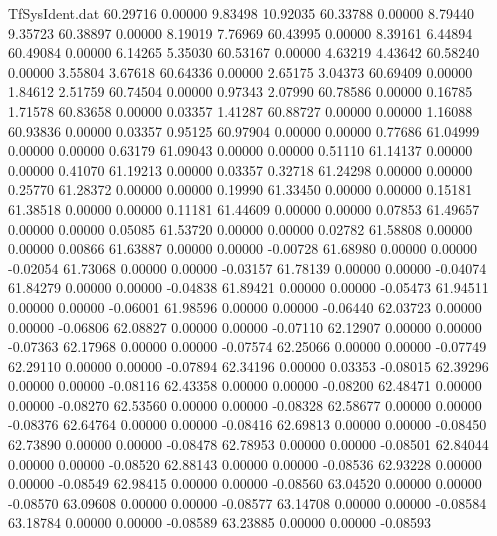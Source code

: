 \begin{filecontents}{TfSysIdent.dat}
  60.29716    0.00000    9.83498   10.92035
  60.33788    0.00000    8.79440    9.35723
  60.38897    0.00000    8.19019    7.76969
  60.43995    0.00000    8.39161    6.44894
  60.49084    0.00000    6.14265    5.35030
  60.53167    0.00000    4.63219    4.43642
  60.58240    0.00000    3.55804    3.67618
  60.64336    0.00000    2.65175    3.04373
  60.69409    0.00000    1.84612    2.51759
  60.74504    0.00000    0.97343    2.07990
  60.78586    0.00000    0.16785    1.71578
  60.83658    0.00000    0.03357    1.41287
  60.88727    0.00000    0.00000    1.16088
  60.93836    0.00000    0.03357    0.95125
  60.97904    0.00000    0.00000    0.77686
  61.04999    0.00000    0.00000    0.63179
  61.09043    0.00000    0.00000    0.51110
  61.14137    0.00000    0.00000    0.41070
  61.19213    0.00000    0.03357    0.32718
  61.24298    0.00000    0.00000    0.25770
  61.28372    0.00000    0.00000    0.19990
  61.33450    0.00000    0.00000    0.15181
  61.38518    0.00000    0.00000    0.11181
  61.44609    0.00000    0.00000    0.07853
  61.49657    0.00000    0.00000    0.05085
  61.53720    0.00000    0.00000    0.02782
  61.58808    0.00000    0.00000    0.00866
  61.63887    0.00000    0.00000   -0.00728
  61.68980    0.00000    0.00000   -0.02054
  61.73068    0.00000    0.00000   -0.03157
  61.78139    0.00000    0.00000   -0.04074
  61.84279    0.00000    0.00000   -0.04838
  61.89421    0.00000    0.00000   -0.05473
  61.94511    0.00000    0.00000   -0.06001
  61.98596    0.00000    0.00000   -0.06440
  62.03723    0.00000    0.00000   -0.06806
  62.08827    0.00000    0.00000   -0.07110
  62.12907    0.00000    0.00000   -0.07363
  62.17968    0.00000    0.00000   -0.07574
  62.25066    0.00000    0.00000   -0.07749
  62.29110    0.00000    0.00000   -0.07894
  62.34196    0.00000    0.03353   -0.08015
  62.39296    0.00000    0.00000   -0.08116
  62.43358    0.00000    0.00000   -0.08200
  62.48471    0.00000    0.00000   -0.08270
  62.53560    0.00000    0.00000   -0.08328
  62.58677    0.00000    0.00000   -0.08376
  62.64764    0.00000    0.00000   -0.08416
  62.69813    0.00000    0.00000   -0.08450
  62.73890    0.00000    0.00000   -0.08478
  62.78953    0.00000    0.00000   -0.08501
  62.84044    0.00000    0.00000   -0.08520
  62.88143    0.00000    0.00000   -0.08536
  62.93228    0.00000    0.00000   -0.08549
  62.98415    0.00000    0.00000   -0.08560
  63.04520    0.00000    0.00000   -0.08570
  63.09608    0.00000    0.00000   -0.08577
  63.14708    0.00000    0.00000   -0.08584
  63.18784    0.00000    0.00000   -0.08589
  63.23885    0.00000    0.00000   -0.08593

\end{filecontents}
